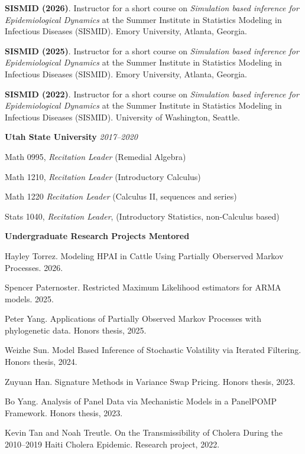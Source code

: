 \documentclass[11pt]{article}
\newenvironment {reflist}
                {
                 \begin{list}{}
                 {\setlength{\labelwidth}{0mm}
                  \setlength{\leftmargin}{8mm}
                  \setlength{\itemindent}{-3mm}
                  \setlength{\labelsep}{0mm}
                  \setlength{\parsep}{0.1 ex}
                  \setlength{\itemsep}{0.1cm}
      \setlength{\topsep}{0.15cm}}} %
   {\end{list}}
\newenvironment {teachinglsit}
                {
                 \begin{list}{}
                 {\setlength{\labelwidth}{0mm}
                  \setlength{\leftmargin}{5mm}
                  \setlength{\labelsep}{0mm}
                  \setlength{\parsep}{0.1 ex}
                  \setlength{\itemsep}{1pt}
      \setlength{\topsep}{0.15cm}}} %
   {\end{list}}
\begin{document}
\vspace{2mm}
\noindent \textbf{SISMID (2026)}. Instructor for a short course on {\it Simulation based inference for Epidemiological Dynamics} at the Summer Institute in Statistics Modeling in Infectious Diseases (SISMID). Emory University, Atlanta, Georgia.

\vspace{2mm}
\noindent \textbf{SISMID (2025)}. Instructor for a short course on {\it Simulation based inference for Epidemiological Dynamics} at the Summer Institute in Statistics Modeling in Infectious Diseases (SISMID). Emory University, Atlanta, Georgia.

\vspace{2mm}
\noindent \textbf{SISMID (2022)}. Instructor for a short course on {\it Simulation based inference for Epidemiological Dynamics} at the Summer Institute in Statistics Modeling in Infectious Diseases (SISMID). University of Washington, Seattle.

\vspace{2mm}
\noindent \textbf{Utah State University} \hfill  {\textit{2017--2020}}

\begin{teachinglsit}
    \item Math 0995, {\it Recitation Leader} (Remedial Algebra)
    \item Math 1210, {\it Recitation Leader} (Introductory Calculus)
    \item Math 1220 {\it Recitation Leader} (Calculus II, sequences and series)
    \item Stats 1040, {\it Recitation Leader}, (Introductory Statistics, non-Calculus based)
\end{teachinglsit}

\noindent \textbf{Undergraduate Research Projects Mentored}

\begin{reflist}

  \item Hayley Torrez. Modeling HPAI in Cattle Using Partially Oberserved Markov Processes. 2026.
  \item Spencer Paternoster. Restricted Maximum Likelihood estimators for ARMA models. 2025.
  \item Peter Yang. Applications of Partially Observed Markov Processes with phylogenetic data. Honors thesis, 2025.
  \item Weizhe Sun. Model Based Inference of Stochastic Volatility via Iterated Filtering. Honors thesis, 2024.
  \item Zuyuan Han. Signature Methods in Variance Swap Pricing. Honors thesis, 2023.
  \item Bo Yang. Analysis of Panel Data via Mechanistic Models in a PanelPOMP Framework. Honors thesis, 2023.
  \item Kevin Tan and Noah Treutle. On the Transmissibility of Cholera During the 2010--2019 Haiti Cholera Epidemic. Research project, 2022.

\end{reflist}
\end{document}
